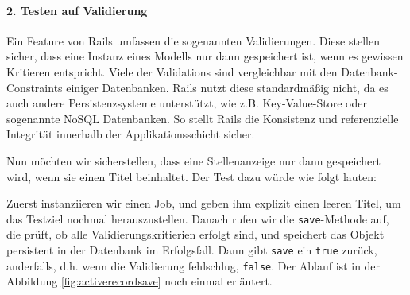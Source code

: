 \paragraph{2. Testen auf Validierung}

Ein Feature von Rails umfassen die sogenannten Validierungen. Diese stellen sicher, dass eine Instanz eines Modells nur dann gespeichert ist, wenn es gewissen Kritieren entspricht. Viele der Validations sind vergleichbar mit den Datenbank-Constraints einiger Datenbanken. Rails nutzt diese standardmäßig nicht, da es auch andere Persistenzsysteme unterstützt, wie z.B. Key-Value-Store oder sogenannte NoSQL Datenbanken. So stellt Rails die Konsistenz und referenzielle Integrität innerhalb der Applikationsschicht sicher.

Nun möchten wir sicherstellen, dass eine Stellenanzeige nur dann gespeichert wird, wenn sie einen Titel beinhaltet. Der Test dazu würde wie folgt lauten:

\begin{ruby}[label={test/units/job\_test.rb}]
 

   
    
      
      
     
\end{ruby}
\tddred
Zuerst instanziieren wir einen Job, und geben ihm explizit einen leeren Titel, um das Testziel nochmal herauszustellen. Danach rufen wir die \texttt{save}-Methode auf, die prüft, ob alle Validierungskritierien erfolgt sind, und speichert das Objekt persistent in der Datenbank im Erfolgsfall. Dann gibt \texttt{save} ein \texttt{true} zurück, anderfalls, d.h. wenn die Validierung fehlschlug, \texttt{false}.
Der Ablauf ist in der Abbildung \ref{fig:activerecordsave} noch einmal erläutert.

